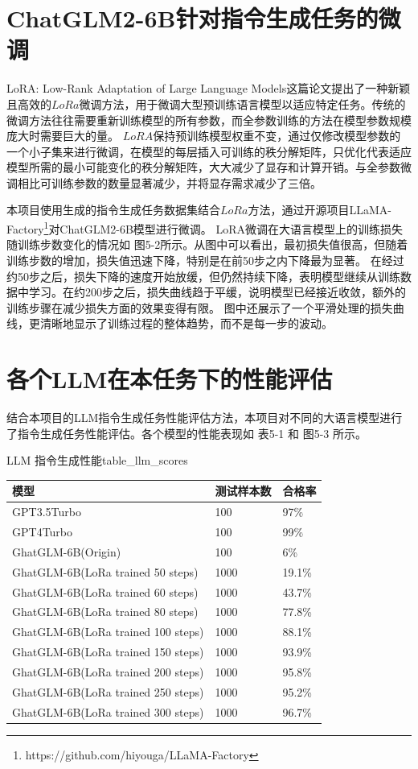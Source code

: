 \documentclass[a4paper,AutoFakeBold,oneside,12pt]{book}
\begin{document}
\section{ChatGLM2-6B针对指令生成任务的微调}
LoRA: Low-Rank Adaptation of Large Language Models\cite{hu2021lora}这篇论文提出了一种新颖且高效的$LoRa$微调方法，用于微调大型预训练语言模型以适应特定任务。传统的微调方法往往需要重新训练模型的所有参数，而全参数训练的方法在模型参数规模庞大时需要巨大的量。
$LoRA$保持预训练模型权重不变，通过仅修改模型参数的一个小子集来进行微调，在模型的每层插入可训练的秩分解矩阵，只优化代表适应模型所需的最小可能变化的秩分解矩阵，大大减少了显存和计算开销。与全参数微调相比可训练参数的数量显著减少，并将显存需求减少了三倍。

本项目使用生成的指令生成任务数据集结合$LoRa$方法，通过开源项目LLaMA-Factory\footnote{https://github.com/hiyouga/LLaMA-Factory}对ChatGLM2-6B模型进行微调。
LoRA微调在大语言模型上的训练损失随训练步数变化的情况如 图5-2所示。从图中可以看出，最初损失值很高，但随着训练步数的增加，损失值迅速下降，特别是在前50步之内下降最为显著。
在经过约50步之后，损失下降的速度开始放缓，但仍然持续下降，表明模型继续从训练数据中学习。在约200步之后，损失曲线趋于平缓，说明模型已经接近收敛，额外的训练步骤在减少损失方面的效果变得有限。
图中还展示了一个平滑处理的损失曲线，更清晰地显示了训练过程的整体趋势，而不是每一步的波动。

\section{各个LLM在本任务下的性能评估}
结合本项目的LLM指令生成任务性能评估方法，本项目对不同的大语言模型进行了指令生成任务性能评估。各个模型的性能表现如 表5-1 和 图5-3 所示。
\begin{bupttable}{LLM 指令生成性能}{table_llm_scores}
    \begin{tabular}{|l|l|l|}
        \hline \textbf{模型} & \textbf{测试样本数} & \textbf{合格率} \\
        \hline GPT3.5Turbo & 100 & 97\% \\
        \hline GPT4Turbo & 100 & 99\% \\
        \hline GhatGLM-6B(Origin) & 100 & 6\% \\
        \hline GhatGLM-6B(LoRa trained 50 steps) & 1000 & 19.1\% \\
        \hline GhatGLM-6B(LoRa trained 60 steps) & 1000 & 43.7\% \\
        \hline GhatGLM-6B(LoRa trained 80 steps) & 1000 & 77.8\% \\
        \hline GhatGLM-6B(LoRa trained 100 steps) & 1000 & 88.1\% \\
        \hline GhatGLM-6B(LoRa trained 150 steps) & 1000 & 93.9\% \\
        \hline GhatGLM-6B(LoRa trained 200 steps) & 1000 & 95.8\% \\
        \hline GhatGLM-6B(LoRa trained 250 steps) & 1000 & 95.2\% \\
        \hline GhatGLM-6B(LoRa trained 300 steps) & 1000 & 96.7\% \\
        \hline
    \end{tabular}
\end{bupttable}
\end{document}
